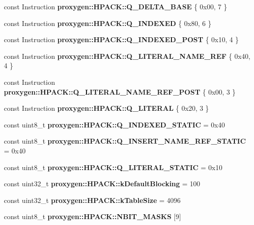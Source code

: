 \begin{DoxyCompactItemize}
const Instruction {\bf proxygen\+::\+H\+P\+A\+C\+K\+::\+Q\+\_\+\+D\+E\+L\+T\+A\+\_\+\+B\+A\+SE} \{ 0x00, 7 \}
\item 
const Instruction {\bf proxygen\+::\+H\+P\+A\+C\+K\+::\+Q\+\_\+\+I\+N\+D\+E\+X\+ED} \{ 0x80, 6 \}
\item 
const Instruction {\bf proxygen\+::\+H\+P\+A\+C\+K\+::\+Q\+\_\+\+I\+N\+D\+E\+X\+E\+D\+\_\+\+P\+O\+ST} \{ 0x10, 4 \}
\item 
const Instruction {\bf proxygen\+::\+H\+P\+A\+C\+K\+::\+Q\+\_\+\+L\+I\+T\+E\+R\+A\+L\+\_\+\+N\+A\+M\+E\+\_\+\+R\+EF} \{ 0x40, 4 \}
\item 
const Instruction {\bf proxygen\+::\+H\+P\+A\+C\+K\+::\+Q\+\_\+\+L\+I\+T\+E\+R\+A\+L\+\_\+\+N\+A\+M\+E\+\_\+\+R\+E\+F\+\_\+\+P\+O\+ST} \{ 0x00, 3 \}
\item 
const Instruction {\bf proxygen\+::\+H\+P\+A\+C\+K\+::\+Q\+\_\+\+L\+I\+T\+E\+R\+AL} \{ 0x20, 3 \}
\item 
const uint8\+\_\+t {\bf proxygen\+::\+H\+P\+A\+C\+K\+::\+Q\+\_\+\+I\+N\+D\+E\+X\+E\+D\+\_\+\+S\+T\+A\+T\+IC} = 0x40
\item 
const uint8\+\_\+t {\bf proxygen\+::\+H\+P\+A\+C\+K\+::\+Q\+\_\+\+I\+N\+S\+E\+R\+T\+\_\+\+N\+A\+M\+E\+\_\+\+R\+E\+F\+\_\+\+S\+T\+A\+T\+IC} = 0x40
\item 
const uint8\+\_\+t {\bf proxygen\+::\+H\+P\+A\+C\+K\+::\+Q\+\_\+\+L\+I\+T\+E\+R\+A\+L\+\_\+\+S\+T\+A\+T\+IC} = 0x10
\item 
const uint32\+\_\+t {\bf proxygen\+::\+H\+P\+A\+C\+K\+::k\+Default\+Blocking} = 100
\item 
const uint32\+\_\+t {\bf proxygen\+::\+H\+P\+A\+C\+K\+::k\+Table\+Size} = 4096
\item 
const uint8\+\_\+t {\bf proxygen\+::\+H\+P\+A\+C\+K\+::\+N\+B\+I\+T\+\_\+\+M\+A\+S\+KS} [9]
\end{DoxyCompactItemize}
